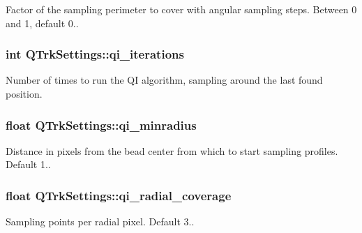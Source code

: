 Factor of the sampling perimeter to cover with angular sampling steps. Between 0 and 1, default 0.. 

\subsubsection[{\texorpdfstring{qi\+\_\+iterations}{qi_iterations}}]{\setlength{\rightskip}{0pt plus 5cm}int Q\+Trk\+Settings\+::qi\+\_\+iterations}\hypertarget{struct_q_trk_settings_a12105babb328a9a7ec90f0eab074fabb}{}\label{struct_q_trk_settings_a12105babb328a9a7ec90f0eab074fabb}


Number of times to run the QI algorithm, sampling around the last found position. 

\subsubsection[{\texorpdfstring{qi\+\_\+minradius}{qi_minradius}}]{\setlength{\rightskip}{0pt plus 5cm}float Q\+Trk\+Settings\+::qi\+\_\+minradius}\hypertarget{struct_q_trk_settings_a7b5f3e61b4dcab6330c56e7bcd96e82d}{}\label{struct_q_trk_settings_a7b5f3e61b4dcab6330c56e7bcd96e82d}


Distance in pixels from the bead center from which to start sampling profiles. Default 1.. 

\subsubsection[{\texorpdfstring{qi\+\_\+radial\+\_\+coverage}{qi_radial_coverage}}]{\setlength{\rightskip}{0pt plus 5cm}float Q\+Trk\+Settings\+::qi\+\_\+radial\+\_\+coverage}\hypertarget{struct_q_trk_settings_abee59fa2f68d9e514500062f73b1d512}{}\label{struct_q_trk_settings_abee59fa2f68d9e514500062f73b1d512}


Sampling points per radial pixel. Default 3.. 

